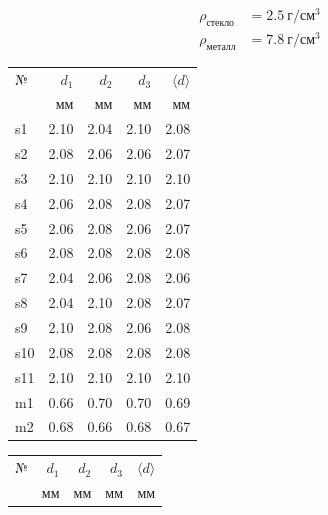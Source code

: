 \documentclass[a4paper, 12pt]{article}
\begin{document}
\begin{align*} \rho_{\text{стекло}} & =2.5\ \text{г}/\text{см}^3 \\ \rho_{\text{металл}} & =7.8\ \text{г}/\text{см}^3
\end{align*}


\begin{table}[h!]
    \vspace{5pt}
    \begin{center}
        \subtable
        {
            \begin{tabular}{|l|rrr|r|}
                \hline
                №   & $d_1$ & $d_2$ & $d_3$ & $\langle d \rangle$ \\
                    & мм    & мм    & мм    & мм                  \\
                \hline
                s1  & 2.10  & 2.04  & 2.10  & 2.08                \\
                s2  & 2.08  & 2.06  & 2.06  & 2.07                \\
                s3  & 2.10  & 2.10  & 2.10  & 2.10                \\
                s4  & 2.06  & 2.08  & 2.08  & 2.07                \\
                s5  & 2.06  & 2.08  & 2.06  & 2.07                \\
                s6  & 2.08  & 2.08  & 2.08  & 2.08                \\
                s7  & 2.04  & 2.06  & 2.08  & 2.06                \\
                s8  & 2.04  & 2.10  & 2.08  & 2.07                \\
                s9  & 2.10  & 2.08  & 2.06  & 2.08                \\
                s10 & 2.08  & 2.08  & 2.08  & 2.08                \\
                s11 & 2.10  & 2.10  & 2.10  & 2.10                \\
                m1  & 0.66  & 0.70  & 0.70  & 0.69                \\
                m2  & 0.68  & 0.66  & 0.68  & 0.67                \\
                \hline
            \end{tabular}
        }
        \subtable
        {
            \begin{tabular}{|l|rrr|r|}
                \hline
                №   & $d_1$ & $d_2$ & $d_3$ & $\langle d \rangle$ \\
                    & мм    & мм    & мм    & мм                  \\

\end{tabular}}
\end{center}
\end{table}
\end{document}
